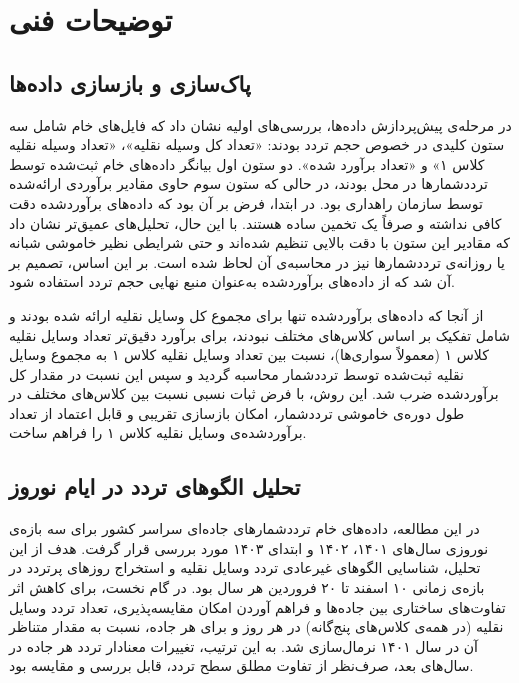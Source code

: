 \documentclass[a4paper, 12pt]{article}
\begin{document}
\newpage
\section{توضیحات فنی}

\subsection{پاک‌سازی و بازسازی داده‌ها}

در مرحله‌ی پیش‌پردازش داده‌ها، بررسی‌های اولیه نشان داد که فایل‌های خام شامل سه ستون کلیدی در خصوص حجم تردد بودند: «تعداد کل وسیله نقلیه»، «تعداد وسیله نقلیه کلاس ۱» و «تعداد برآورد شده». دو ستون اول بیانگر داده‌های خام ثبت‌شده توسط ترددشمارها در محل بودند، در حالی که ستون سوم حاوی مقادیر برآوردی ارائه‌شده توسط سازمان راهداری بود. در ابتدا، فرض بر آن بود که داده‌های برآوردشده دقت کافی نداشته و صرفاً یک تخمین ساده هستند. با این حال، تحلیل‌های عمیق‌تر نشان داد که مقادیر این ستون با دقت بالایی تنظیم شده‌اند و حتی شرایطی نظیر خاموشی شبانه یا روزانه‌ی ترددشمارها نیز در محاسبه‌ی آن لحاظ شده است. بر این اساس، تصمیم بر آن شد که از داده‌های برآوردشده به‌عنوان منبع نهایی حجم تردد استفاده شود.

\medskip
از آنجا که داده‌های برآوردشده تنها برای مجموع کل وسایل نقلیه ارائه شده بودند و شامل تفکیک بر اساس کلاس‌های مختلف نبودند، برای برآورد دقیق‌تر تعداد وسایل نقلیه کلاس ۱ (معمولاً سواری‌ها)، نسبت بین تعداد وسایل نقلیه کلاس ۱ به مجموع وسایل نقلیه ثبت‌شده توسط ترددشمار محاسبه گردید و سپس این نسبت در مقدار کل برآوردشده ضرب شد. این روش، با فرض ثبات نسبی نسبت بین کلاس‌های مختلف در طول دوره‌ی خاموشی ترددشمار، امکان بازسازی تقریبی و قابل اعتماد از تعداد برآوردشده‌ی وسایل نقلیه کلاس ۱ را فراهم ساخت.

\subsection{تحلیل الگوهای تردد در ایام نوروز}

در این مطالعه، داده‌های خام ترددشمارهای جاده‌ای سراسر کشور برای سه بازه‌ی نوروزی سال‌های ۱۴۰۱، ۱۴۰۲ و ابتدای ۱۴۰۳ مورد بررسی قرار گرفت. هدف از این تحلیل، شناسایی الگوهای غیرعادی تردد وسایل نقلیه و استخراج روزهای پرتردد در بازه‌ی زمانی ۱۰ اسفند تا ۲۰ فروردین هر سال بود. در گام نخست، برای کاهش اثر تفاوت‌های ساختاری بین جاده‌ها و فراهم آوردن امکان مقایسه‌پذیری، تعداد تردد وسایل نقلیه (در همه‌ی کلاس‌های پنج‌گانه) در هر روز و برای هر جاده، نسبت به مقدار متناظر آن در سال ۱۴۰۱ نرمال‌سازی شد. به این ترتیب، تغییرات معنادار تردد هر جاده در سال‌های بعد، صرف‌نظر از تفاوت مطلق سطح تردد، قابل بررسی و مقایسه بود.
\end{document}
